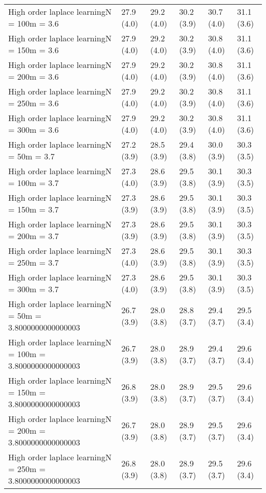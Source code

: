 \documentclass{article}
\begin{document}
\begin{table*}[t!]
\begin{center}
\begin{small}
\begin{sc}
\begin{tabular}{llllll}
High order laplace learningN = 100m = 3.6&27.9 (4.0)      &29.2 (4.0)      &30.2 (3.9)      &30.7 (4.0)      &31.1 (3.6)      \\
High order laplace learningN = 150m = 3.6&27.9 (4.0)      &29.2 (4.0)      &30.2 (3.9)      &30.8 (4.0)      &31.1 (3.6)      \\
High order laplace learningN = 200m = 3.6&27.9 (4.0)      &29.2 (4.0)      &30.2 (3.9)      &30.8 (4.0)      &31.1 (3.6)      \\
High order laplace learningN = 250m = 3.6&27.9 (4.0)      &29.2 (4.0)      &30.2 (3.9)      &30.8 (4.0)      &31.1 (3.6)      \\
High order laplace learningN = 300m = 3.6&27.9 (4.0)      &29.2 (4.0)      &30.2 (3.9)      &30.8 (4.0)      &31.1 (3.6)      \\
High order laplace learningN = 50m = 3.7&27.2 (3.9)      &28.5 (3.9)      &29.4 (3.8)      &30.0 (3.9)      &30.3 (3.5)      \\
High order laplace learningN = 100m = 3.7&27.3 (4.0)      &28.6 (3.9)      &29.5 (3.8)      &30.1 (3.9)      &30.3 (3.5)      \\
High order laplace learningN = 150m = 3.7&27.3 (3.9)      &28.6 (3.9)      &29.5 (3.8)      &30.1 (3.9)      &30.3 (3.5)      \\
High order laplace learningN = 200m = 3.7&27.3 (3.9)      &28.6 (3.9)      &29.5 (3.8)      &30.1 (3.9)      &30.3 (3.5)      \\
High order laplace learningN = 250m = 3.7&27.3 (4.0)      &28.6 (3.9)      &29.5 (3.8)      &30.1 (3.9)      &30.3 (3.5)      \\
High order laplace learningN = 300m = 3.7&27.3 (4.0)      &28.6 (3.9)      &29.5 (3.8)      &30.1 (3.9)      &30.3 (3.5)      \\
High order laplace learningN = 50m = 3.8000000000000003&26.7 (3.9)      &28.0 (3.8)      &28.8 (3.7)      &29.4 (3.7)      &29.5 (3.4)      \\
High order laplace learningN = 100m = 3.8000000000000003&26.7 (3.9)      &28.0 (3.8)      &28.9 (3.7)      &29.4 (3.7)      &29.6 (3.4)      \\
High order laplace learningN = 150m = 3.8000000000000003&26.8 (3.9)      &28.0 (3.8)      &28.9 (3.7)      &29.5 (3.7)      &29.6 (3.4)      \\
High order laplace learningN = 200m = 3.8000000000000003&26.7 (3.9)      &28.0 (3.8)      &28.9 (3.7)      &29.5 (3.7)      &29.6 (3.4)      \\
High order laplace learningN = 250m = 3.8000000000000003&26.8 (3.9)      &28.0 (3.8)      &28.9 (3.7)      &29.5 (3.7)      &29.6 (3.4)      \\

\end{tabular}
\end{sc}
\end{small}
\end{center}
\end{table*}
\end{document}
